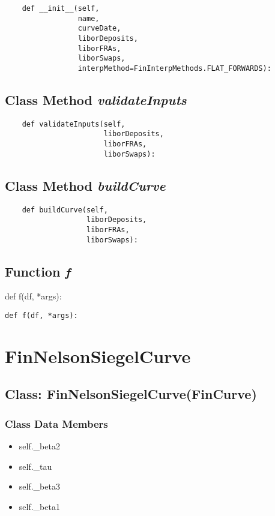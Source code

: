 \documentclass[twoside,11pt]{book}
\begin{document}
\begin{lstlisting}
    def __init__(self,
                 name,
                 curveDate,
                 liborDeposits,
                 liborFRAs,
                 liborSwaps,
                 interpMethod=FinInterpMethods.FLAT_FORWARDS):
\end{lstlisting}

\subsection{Class Method {\it validateInputs}}


\begin{lstlisting}
    def validateInputs(self,
                       liborDeposits,
                       liborFRAs,
                       liborSwaps):
\end{lstlisting}

\subsection{Class Method {\it buildCurve}}


\begin{lstlisting}
    def buildCurve(self,
                   liborDeposits,
                   liborFRAs,
                   liborSwaps):
\end{lstlisting}

\subsection{Function {\it f}}
def f(df, *args):

\begin{lstlisting}
def f(df, *args):
\end{lstlisting}

\newpage
\section{FinNelsonSiegelCurve}

\subsection{Class: FinNelsonSiegelCurve(FinCurve)}


\subsubsection{Class Data Members}
\begin{itemize}
\item{self.\_beta2}
\item{self.\_tau}
\item{self.\_beta3}
\item{self.\_beta1}
\end{itemize}
\end{document}
